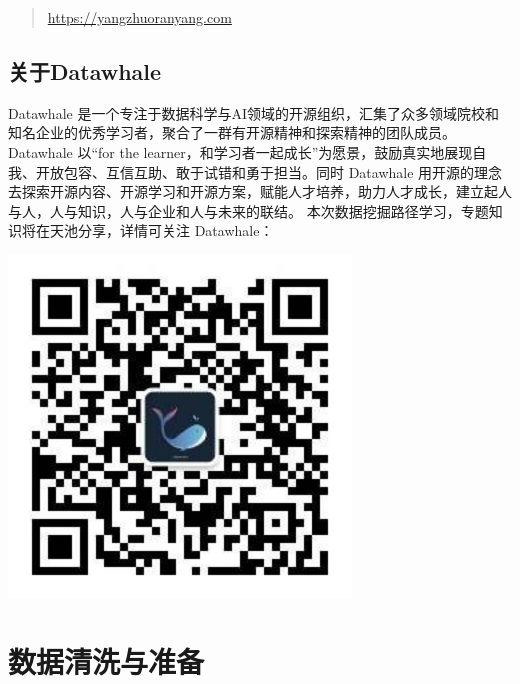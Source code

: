 \documentclass[]{ctexbook}
\begin{document}
\begin{quote}
\url{https://yangzhuoranyang.com}
\end{quote}

\hypertarget{ux5173ux4e8edatawhale-1}{%
\subsection*{关于Datawhale}\label{ux5173ux4e8edatawhale-1}}


Datawhale 是一个专注于数据科学与AI领域的开源组织，汇集了众多领域院校和知名企业的优秀学习者，聚合了一群有开源精神和探索精神的团队成员。Datawhale 以``for the learner，和学习者一起成长''为愿景，鼓励真实地展现自我、开放包容、互信互助、敢于试错和勇于担当。同时 Datawhale 用开源的理念去探索开源内容、开源学习和开源方案，赋能人才培养，助力人才成长，建立起人与人，人与知识，人与企业和人与未来的联结。 本次数据挖掘路径学习，专题知识将在天池分享，详情可关注 Datawhale：

\includegraphics[width=3.58in]{image/logo}

\hypertarget{task-02}{%
\section{数据清洗与准备}\label{task-02}}
\end{document}
